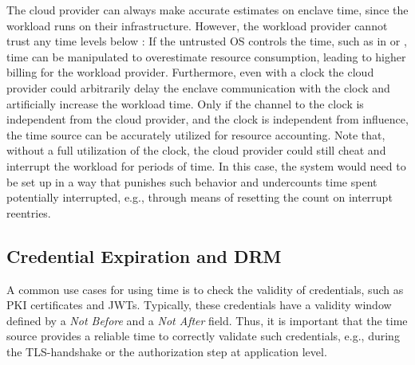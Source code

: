 \documentclass[sigplan,10pt]{acmart}
\begin{document}
The cloud provider can always make accurate estimates on enclave time, since the
workload runs on their infrastructure. However, the workload provider cannot
trust any time levels below \Tthree{}:
If the untrusted OS controls the time, such as in \Tzero or \Tone, 
time can be manipulated to overestimate resource consumption, leading to higher billing for the workload provider. 
Furthermore, even with a \Ttwo clock the cloud provider could arbitrarily delay the enclave communication with the clock and artificially increase the workload time. 
Only if the channel to
the clock is independent from the cloud provider, and the clock is independent
from influence, the time source can be accurately utilized for resource
accounting. Note that, without a full \Tfour utilization of the clock, the cloud
provider could still cheat and interrupt the workload for periods of time. In
this case, the system would need to be set up in a way that punishes such
behavior and undercounts time spent potentially interrupted, e.g., through means
of resetting the count on interrupt reentries.

\subsection{Credential Expiration and DRM}
\label{sec:usecases:tfour}
%
A common use cases for using time is to check the validity of
credentials, such as PKI certificates and \acp{JWT}. Typically, these
credentials have a validity window defined by a \emph{Not Before} and a
\emph{Not After} field. Thus, it is important that the time source provides a
reliable time to correctly validate such credentials, e.g., during the
TLS-handshake or the authorization step at application level.
\end{document}
